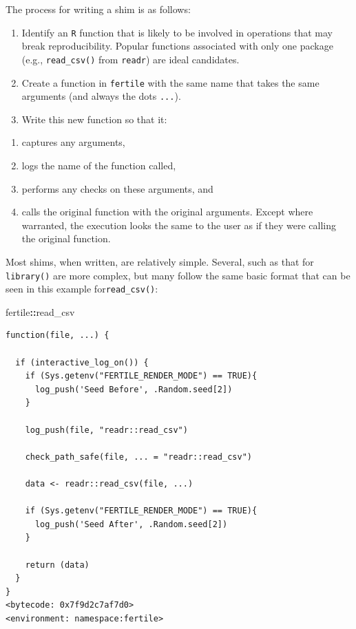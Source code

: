 \documentclass[12pt,twoside]{reedthesis}
\newenvironment{Shaded}{\begin{snugshade}}{\end{snugshade}}
\newcommand{\OperatorTok}[1]{\textcolor[rgb]{0.81,0.36,0.00}{\textbf{#1}}}
\newcommand{\NormalTok}[1]{#1}
\providecommand{\tightlist}{%
  \setlength{\itemsep}{0pt}\setlength{\parskip}{0pt}}
\begin{document}
The process for writing a shim is as follows:
\begin{enumerate}
\def\labelenumi{\arabic{enumi}.}
\item
  Identify an \texttt{R} function that is likely to be involved in
  operations that may break reproducibility. Popular functions
  associated with only one package (e.g., \texttt{read\_csv()} from
  \texttt{readr}) are ideal candidates.
\item
  Create a function in \texttt{fertile} with the same name that takes
  the same arguments (and always the dots \texttt{...}).
\item
  Write this new function so that it:
\end{enumerate}
\begin{enumerate}
\def\labelenumi{\alph{enumi})}
\tightlist
\item
  captures any arguments,
\item
  logs the name of the function called,
\item
  performs any checks on these arguments, and
\item
  calls the original function with the original arguments. Except where
  warranted, the execution looks the same to the user as if they were
  calling the original function.
\end{enumerate}
Most shims, when written, are relatively simple. Several, such as that
for \texttt{library()} are more complex, but many follow the same basic
format that can be seen in this example for\texttt{read\_csv()}:
\begin{Shaded}
\begin{Highlighting}[]
\NormalTok{fertile}\OperatorTok{::}\NormalTok{read_csv}
\end{Highlighting}
\end{Shaded}
\begin{verbatim}
function(file, ...) {

  if (interactive_log_on()) {
    if (Sys.getenv("FERTILE_RENDER_MODE") == TRUE){
      log_push('Seed Before', .Random.seed[2])
    }

    log_push(file, "readr::read_csv")

    check_path_safe(file, ... = "readr::read_csv")

    data <- readr::read_csv(file, ...)

    if (Sys.getenv("FERTILE_RENDER_MODE") == TRUE){
      log_push('Seed After', .Random.seed[2])
    }

    return (data)
  }
}
<bytecode: 0x7f9d2c7af7d0>
<environment: namespace:fertile>
\end{verbatim}
\end{document}
